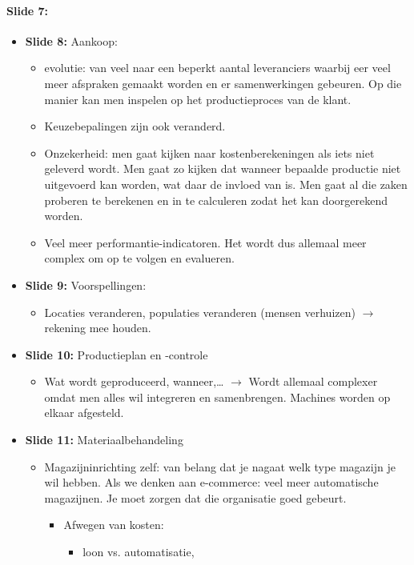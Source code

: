 \documentclass[10pt,a4paper]{report}
\begin{document}
\paragraph{Slide 7:}
\begin{itemize} 
\item \textbf{Slide 8:} Aankoop:
\begin{itemize}
\item  evolutie: van veel naar een beperkt aantal leveranciers waarbij eer veel meer afspraken gemaakt worden en er samenwerkingen gebeuren. Op die manier kan men inspelen op het productieproces van de klant.
\item Keuzebepalingen zijn ook veranderd.
\item Onzekerheid: men gaat kijken naar kostenberekeningen als iets niet geleverd wordt. Men gaat zo kijken dat wanneer bepaalde productie niet uitgevoerd kan worden, wat daar de invloed van is. Men gaat al die zaken proberen te berekenen en in te calculeren zodat het kan doorgerekend worden.
\item Veel meer performantie-indicatoren. Het wordt dus allemaal meer complex om op te volgen en evalueren.
\end{itemize}
\item \textbf{Slide 9:} Voorspellingen:
\begin{itemize}
\item Locaties veranderen, populaties veranderen (mensen verhuizen) $\rightarrow$ rekening mee houden.
\end{itemize} 
\item \textbf{Slide 10:} Productieplan en -controle
\begin{itemize}
\item Wat wordt geproduceerd, wanneer,… $\rightarrow$ Wordt allemaal complexer omdat men alles wil integreren en samenbrengen. Machines worden op elkaar afgesteld. 
\end{itemize}
\item \textbf{Slide 11:} Materiaalbehandeling
\begin{itemize}
\item Magazijninrichting zelf: van belang dat je nagaat welk type magazijn je wil hebben. Als we denken aan e-commerce: veel meer automatische magazijnen. Je moet zorgen dat die organisatie goed gebeurt. 
\begin{itemize}
\item Afwegen van kosten: 
\begin{itemize}
\item loon vs. automatisatie, 

\end{itemize}
\end{itemize}
\end{itemize}
\end{itemize}
\end{document}
